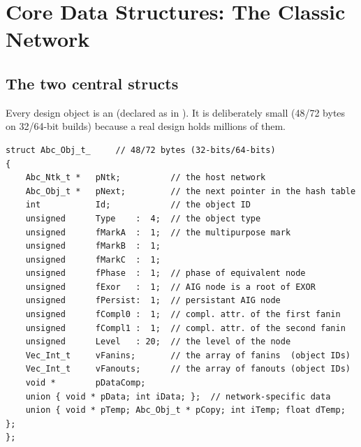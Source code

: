\chapter{Core Data Structures: The Classic Network}
\label{ch:data}


\section{The two central structs}

Every design object is an  (declared as 
in ). It is deliberately small (48/72 bytes on
32/64-bit builds) because a real design holds millions of them.

\begin{lstlisting}[style=abccode]
struct Abc_Obj_t_     // 48/72 bytes (32-bits/64-bits)
{
    Abc_Ntk_t *   pNtk;          // the host network
    Abc_Obj_t *   pNext;         // the next pointer in the hash table
    int           Id;            // the object ID
    unsigned      Type    :  4;  // the object type
    unsigned      fMarkA  :  1;  // the multipurpose mark
    unsigned      fMarkB  :  1;
    unsigned      fMarkC  :  1;
    unsigned      fPhase  :  1;  // phase of equivalent node
    unsigned      fExor   :  1;  // AIG node is a root of EXOR
    unsigned      fPersist:  1;  // persistant AIG node
    unsigned      fCompl0 :  1;  // compl. attr. of the first fanin
    unsigned      fCompl1 :  1;  // compl. attr. of the second fanin
    unsigned      Level   : 20;  // the level of the node
    Vec_Int_t     vFanins;       // the array of fanins  (object IDs)
    Vec_Int_t     vFanouts;      // the array of fanouts (object IDs)
    void *        pDataComp;
    union { void * pData; int iData; };  // network-specific data
    union { void * pTemp; Abc_Obj_t * pCopy; int iTemp; float dTemp; };
};
\end{lstlisting}

